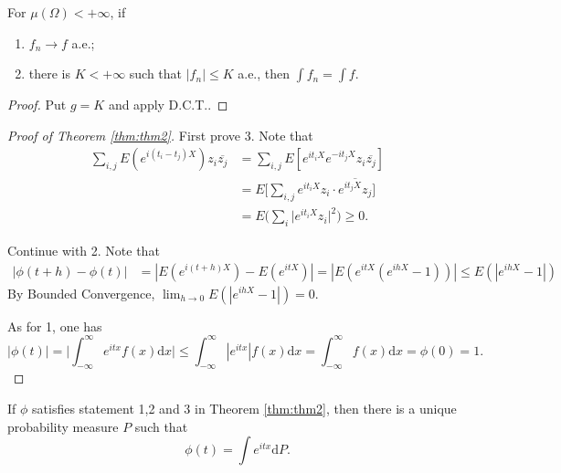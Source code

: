 \documentclass[11pt,singlecolumn, openany, citestyle=authoryear]{elegantbook}
\begin{document}
\begin{CJK}{UTF8}{gbsn}
\begin{theorem}
    For $\mu(\Omega)<+\infty$, if 
    \begin{enumerate}
        \item $f_n\to f$ a.e.;
        \item there is $K<+\infty$ such that $|f_n|\leqslant K$ a.e., then 
        $\displaystyle \int f_n = \int f$.
    \end{enumerate}
\end{theorem}
\begin{proof}
    Put $g=K$ and apply D.C.T..
\end{proof}

\begin{proof}[Proof of Theorem \ref{thm:thm2}]
    First prove 3. Note that 
    \begin{align*}
        \sum_{i,j} E(e^{i(t_i- t_j)X})z_i \overline{z_j}&= \sum_{i,j}E[e^{it_i X}
        e^{-it_j X}z_i\overline{z_j}]\\
        &= E\bigg[
            \sum_{i,j} e^{it_iX}z_i \cdot \overline{e^{it_jX}z_j}
        \bigg]\\
        &=E\biggl(\sum_{i}
            \bigg|
            e^{it_i X}z_i
            \bigg|^2
        \biggr)\geqslant 0.
    \end{align*}

    Continue with 2. Note that 
    \begin{align*}
        |\phi(t+h)-\phi(t)| &= |E(e^{i(t+h)X})-E(e^{itX})|=
        |E(e^{itX}(e^{ihX}-1))| \leqslant E(|e^{ihX}-1|)
    \end{align*}
    By Bounded Convergence, $\displaystyle \lim_{h\to 0} E(|e^{ihX}-1|)=0$.

    As for 1, one has 
    $$
    |\phi(t)|=\bigg| \int_{-\infty}^\infty e^{itx}f(x)\mathrm{d}x \bigg|
    \leqslant \int_{-\infty}^\infty |e^{itx}|f(x)\mathrm{d}x = 
    \int_{-\infty}^\infty f(x)\mathrm{d}x = \phi(0)=1.
    $$
\end{proof}

\begin{theorem}[Bachner]
    If $\phi$ satisfies statement 1,2 and 3 in Theorem \ref{thm:thm2}, then there is 
    a unique probability measure $P$ such that 
    $$
    \phi(t)=\int e^{itx}\mathrm{d}P.
    $$
\end{theorem}


\end{CJK}
\end{document}
